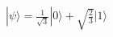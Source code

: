 \documentclass[preview]{standalone}
\begin{document}
\begin{align*}
|\psi\rangle = \frac{1}{\sqrt{3}}|0\rangle + \sqrt{\frac{2}{3}}|1\rangle
\end{align*}
\end{document}
